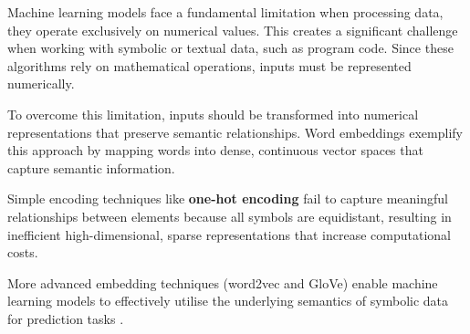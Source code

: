 



Machine learning models face a fundamental limitation when processing data, they operate exclusively on numerical values. This creates a significant challenge when working with symbolic or textual data, such as program code. Since these algorithms rely on mathematical operations, inputs must be represented numerically.

To overcome this limitation, inputs should be transformed into numerical representations that preserve semantic relationships. Word embeddings exemplify this approach by mapping words into dense, continuous vector spaces that capture semantic information.

Simple encoding techniques like \textbf{one-hot encoding} fail to capture meaningful relationships between elements because all symbols are equidistant, resulting in inefficient high-dimensional, sparse representations that increase computational costs.

More advanced embedding techniques (word2vec and GloVe) enable machine learning models to effectively utilise the underlying semantics of symbolic data for prediction tasks \cite{Word2Vec, GloVe}.

